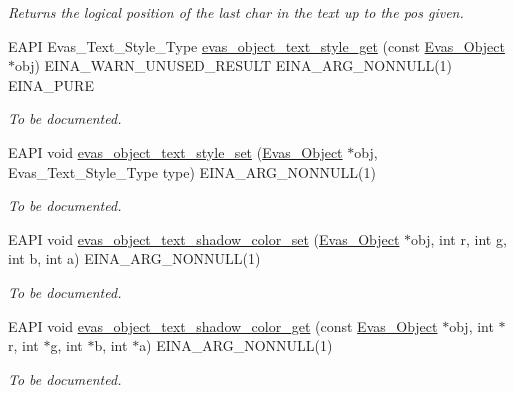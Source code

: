\begin{DoxyCompactItemize}
\begin{DoxyCompactList}\small\item\em Returns the logical position of the last char in the text up to the pos given. \item\end{DoxyCompactList}\item 
EAPI Evas\_\-Text\_\-Style\_\-Type \hyperlink{group__Evas__Object__Text_gaf08d4a9630d23ebdbf79cc8c2c91b2c6}{evas\_\-object\_\-text\_\-style\_\-get} (const \hyperlink{group__Evas__Object__Group_ga9e19e6dd1f517a0ba437c0114d3e7c97}{Evas\_\-Object} $\ast$obj) EINA\_\-WARN\_\-UNUSED\_\-RESULT EINA\_\-ARG\_\-NONNULL(1) EINA\_\-PURE
\begin{DoxyCompactList}\small\item\em To be documented. \item\end{DoxyCompactList}\item 
EAPI void \hyperlink{group__Evas__Object__Text_gae7896521b9861d4bd3efc04ef1e8e91e}{evas\_\-object\_\-text\_\-style\_\-set} (\hyperlink{group__Evas__Object__Group_ga9e19e6dd1f517a0ba437c0114d3e7c97}{Evas\_\-Object} $\ast$obj, Evas\_\-Text\_\-Style\_\-Type type) EINA\_\-ARG\_\-NONNULL(1)
\begin{DoxyCompactList}\small\item\em To be documented. \item\end{DoxyCompactList}\item 
EAPI void \hyperlink{group__Evas__Object__Text_ga58f0bb7acf2c1d24e9ae5e4a391d19bc}{evas\_\-object\_\-text\_\-shadow\_\-color\_\-set} (\hyperlink{group__Evas__Object__Group_ga9e19e6dd1f517a0ba437c0114d3e7c97}{Evas\_\-Object} $\ast$obj, int r, int g, int b, int a) EINA\_\-ARG\_\-NONNULL(1)
\begin{DoxyCompactList}\small\item\em To be documented. \item\end{DoxyCompactList}\item 
EAPI void \hyperlink{group__Evas__Object__Text_ga7cf7432965327a571d413dbaeca66822}{evas\_\-object\_\-text\_\-shadow\_\-color\_\-get} (const \hyperlink{group__Evas__Object__Group_ga9e19e6dd1f517a0ba437c0114d3e7c97}{Evas\_\-Object} $\ast$obj, int $\ast$r, int $\ast$g, int $\ast$b, int $\ast$a) EINA\_\-ARG\_\-NONNULL(1)
\begin{DoxyCompactList}\small\item\em To be documented. \item\end{DoxyCompactList}\item 

\end{DoxyCompactItemize}
